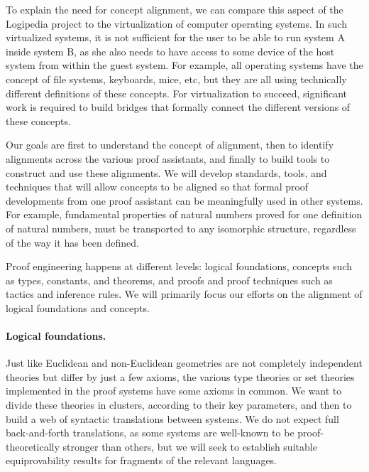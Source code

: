 To explain the need for concept alignment, we can compare this aspect
of the Logipedia project to the virtualization of computer operating
systems. In such virtualized systems, it is not sufficient for the
user to be able to run system A inside system B, as she also needs to
have access to some device of the host system from within the guest
system. For example, all operating systems have the concept of file
systems, keyboards, mice, etc, but they are all using technically
different definitions of these concepts.  For virtualization to
succeed, significant work is required to build bridges that formally
connect the different versions of these concepts.

Our goals are first to understand the concept of alignment, then to
identify alignments across the various proof assistants, and finally
to build tools to construct and use these alignments. We will develop
standards, tools, and techniques that will allow concepts to be
aligned so that formal proof developments from one proof assistant can
be meaningfully used in other systems. For example, fundamental
properties of natural numbers proved for one definition of natural
numbers, must be transported to any isomorphic structure, regardless
of the way it has been defined.

Proof engineering happens at different levels: logical foundations,
concepts such as types, constants, and theorems, and proofs and proof
techniques such as tactics and inference rules. We will primarily
focus our efforts on the alignment of logical foundations and
concepts.

\newcommand{\parag}[1]{\medskip \noindent {\bf #1}}

\paragraph*{Logical foundations.}
Just like Euclidean and non-Euclidean geometries are not completely
independent theories but differ by just a few axioms, the various
type theories or set theories implemented in the proof systems have
some axioms in common.  We want to divide these theories in clusters,
according to their key parameters, and then to build a web of
syntactic translations between systems. We do not expect full
back-and-forth translations, as some systems are well-known to be
proof-theoretically stronger than others, but we will seek to
establish suitable equiprovability results for fragments of the
relevant languages.


